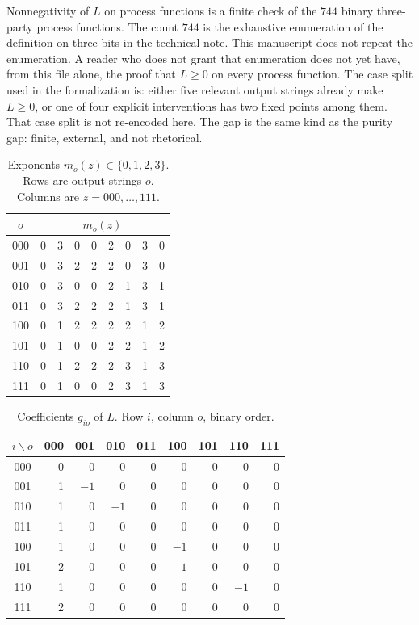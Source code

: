 \documentclass[11pt]{article}
\theoremstyle{definition}
\begin{document}
Nonnegativity of \(L\) on process functions is a finite check of the \(744\) binary three-party process functions. The count \(744\) is the exhaustive enumeration of the definition on three bits in the technical note. This manuscript does not repeat the enumeration. A reader who does not grant that enumeration does not yet have, from this file alone, the proof that \(L\geq 0\) on every process function. The case split used in the formalization is: either five relevant output strings already make \(L\geq 0\), or one of four explicit interventions has two fixed points among them. That case split is not re-encoded here. The gap is the same kind as the purity gap: finite, external, and not rhetorical.

\begin{table}[t]
\centering
\caption{Exponents \(m_o(z)\in\{0,1,2,3\}\). Rows are output strings \(o\). Columns are \(z=000,\ldots,111\).}
\label{tab:m}
\begin{tabular}{c@{\quad}cccccccc}
\toprule
\(o\) & \multicolumn{8}{c}{\(m_o(z)\)}\\
\midrule
000 & 0 & 3 & 0 & 0 & 2 & 0 & 3 & 0\\
001 & 0 & 3 & 2 & 2 & 2 & 0 & 3 & 0\\
010 & 0 & 3 & 0 & 0 & 2 & 1 & 3 & 1\\
011 & 0 & 3 & 2 & 2 & 2 & 1 & 3 & 1\\
100 & 0 & 1 & 2 & 2 & 2 & 2 & 1 & 2\\
101 & 0 & 1 & 0 & 0 & 2 & 2 & 1 & 2\\
110 & 0 & 1 & 2 & 2 & 2 & 3 & 1 & 3\\
111 & 0 & 1 & 0 & 0 & 2 & 3 & 1 & 3\\
\bottomrule
\end{tabular}
\end{table}

\begin{table}[t]
\centering
\caption{Coefficients \(g_{io}\) of \(L\). Row \(i\), column \(o\), binary order.}
\label{tab:g}
\begin{tabular}{c@{\quad}rrrrrrrr}
\toprule
\(i\backslash o\) & 000 & 001 & 010 & 011 & 100 & 101 & 110 & 111\\
\midrule
000 & 0 & 0 & 0 & 0 & 0 & 0 & 0 & 0\\
001 & 1 & $-1$ & 0 & 0 & 0 & 0 & 0 & 0\\
010 & 1 & 0 & $-1$ & 0 & 0 & 0 & 0 & 0\\
011 & 1 & 0 & 0 & 0 & 0 & 0 & 0 & 0\\
100 & 1 & 0 & 0 & 0 & $-1$ & 0 & 0 & 0\\
101 & 2 & 0 & 0 & 0 & $-1$ & 0 & 0 & 0\\
110 & 1 & 0 & 0 & 0 & 0 & 0 & $-1$ & 0\\
111 & 2 & 0 & 0 & 0 & 0 & 0 & 0 & 0\\
\bottomrule
\end{tabular}
\end{table}
\end{document}
